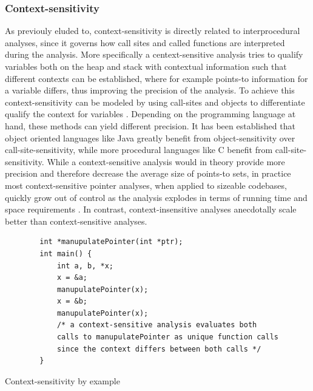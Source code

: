 \subsubsection{Context-sensitivity}
As previouly eluded to, context-sensitivity is directly related to interprocedural analyses, since it governs how call sites and called functions are interpreted during the analysis.
More specifically a centext-sensitive analysis tries to qualify variables both on the heap and stack with contextual information such that different contexts can be established, where for example points-to information for a variable differs, thus improving the precision of the analysis.
To achieve this context-sensitivity can be modeled by using call-sites and objects to differentiate qualify the context for variables \cite{smaragdakis2015pointer}. Depending on the programming language at hand, these methods can yield different precision. It has been established that object oriented languages like Java greatly benefit from object-sensitivity over call-site-sensitivity, while more procedural languages like C benefit from call-site-sensitivity.
While a context-sensitive analysis would in theory provide more precision and therefore decrease the average size of points-to sets, in practice most context-sensitive pointer analyses, when applied to sizeable codebases, quickly grow out of control as the analysis explodes in terms of running time and space requirements \cite{smaragdakis2014introspective}. In contrast, context-insensitive analyses anecdotally scale better than context-sensitive analyses.

\begin{listing}
    \begin{verbatim}
        int *manupulatePointer(int *ptr);
        int main() {
            int a, b, *x;
            x = &a;
            manupulatePointer(x);
            x = &b;
            manupulatePointer(x);
            /* a context-sensitive analysis evaluates both
            calls to manupulatePointer as unique function calls
            since the context differs between both calls */
        }
    \end{verbatim}
    \caption{Context-sensitivity by example}
    \label{lst:contextsens}
\end{listing}

